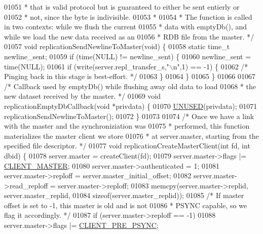 \begin{DoxyCode}
{{{{{{{{{{{{{{{{{{{{{{{{{{{{{{{{{{{{{{{{01051 \textcolor{comment}{ * that is valid protocol but is guaranteed to either be sent entierly or}
01052 \textcolor{comment}{ * not, since the byte is indivisible.}
01053 \textcolor{comment}{ *}
01054 \textcolor{comment}{ * The function is called in two contexts: while we flush the current}
01055 \textcolor{comment}{ * data with emptyDb(), and while we load the new data received as an}
01056 \textcolor{comment}{ * RDB file from the master. */}
01057 \textcolor{keywordtype}{void} replicationSendNewlineToMaster(\textcolor{keywordtype}{void}) \{
01058     \textcolor{keyword}{static} time\_t newline\_sent;
01059     \textcolor{keywordflow}{if} (time(NULL) != newline\_sent) \{
01060         newline\_sent = time(NULL);
01061         \textcolor{keywordflow}{if} (write(server.repl\_transfer\_s,\textcolor{stringliteral}{"\(\backslash\)n"},1) == -1) \{
01062             \textcolor{comment}{/* Pinging back in this stage is best-effort. */}
01063         \}
01064     \}
01065 \}
01066 
01067 \textcolor{comment}{/* Callback used by emptyDb() while flushing away old data to load}
01068 \textcolor{comment}{ * the new dataset received by the master. */}
01069 \textcolor{keywordtype}{void} replicationEmptyDbCallback(\textcolor{keywordtype}{void} *privdata) \{
01070     \hyperlink{server_8h_ae7c9dc8f13568a9c856573751f1ee1ec}{UNUSED}(privdata);
01071     replicationSendNewlineToMaster();
01072 \}
01073 
01074 \textcolor{comment}{/* Once we have a link with the master and the synchroniziation was}
01075 \textcolor{comment}{ * performed, this function materializes the master client we store}
01076 \textcolor{comment}{ * at server.master, starting from the specified file descriptor. */}
01077 \textcolor{keywordtype}{void} replicationCreateMasterClient(\textcolor{keywordtype}{int} fd, \textcolor{keywordtype}{int} dbid) \{
01078     server.master = createClient(fd);
01079     server.master->flags |= \hyperlink{server_8h_a3d8f0cc8d0653ee2b6dafb454292c069}{CLIENT\_MASTER};
01080     server.master->authenticated = 1;
01081     server.master->reploff = server.master\_initial\_offset;
01082     server.master->read\_reploff = server.master->reploff;
01083     memcpy(server.master->replid, server.master\_replid,
01084         \textcolor{keyword}{sizeof}(server.master\_replid));
01085     \textcolor{comment}{/* If master offset is set to -1, this master is old and is not}
01086 \textcolor{comment}{     * PSYNC capable, so we flag it accordingly. */}
01087     \textcolor{keywordflow}{if} (server.master->reploff == -1)
01088         server.master->flags |= \hyperlink{server_8h_ac13d62411270bd658f6d82e711e0f912}{CLIENT\_PRE\_PSYNC};
}}}}}}}}}}}}}}}}}}}}}}}}}}}}}}}}}}}}}}}}
\end{DoxyCode}
